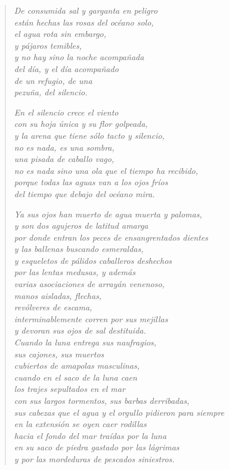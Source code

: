 \documentclass[12pt]{article}
\begin{document}
\clearpage
{}
\begin{verse}

\emph{De consumida sal y garganta en peligro\\
están hechas las rosas del océano solo,\\
el agua rota sin embargo,\\
y pájaros temibles,\\
y no hay sino la noche acompañada\\
del día, y el día acompañado\\
de un refugio, de una\\
pezuña, del silencio.}  

\emph{En el silencio crece el viento\\
con su hoja única y su flor golpeada,\\
y la arena que tiene sólo tacto y silencio,\\
no es nada, es una sombra,\\
una pisada de caballo vago,\\
no es nada sino una ola que el tiempo ha recibido,\\
porque todas las aguas van a los ojos fríos\\
del tiempo que debajo del océano mira.}  

\emph{Ya sus ojos han muerto de agua muerta y palomas,\\
y son dos agujeros de latitud amarga\\
por donde entran los peces de ensangrentados dientes\\
y las ballenas buscando esmeraldas,\\
y esqueletos de pálidos caballeros deshechos\\
por las lentas medusas, y además\\
varias asociaciones de arrayán venenoso,\\
manos aisladas, flechas,\\
revólveres de escama,\\
interminablemente corren por sus mejillas\\
y devoran sus ojos de sal destituida.\\
Cuando la luna entrega sus naufragios,\\
sus cajones, sus muertos\\
cubiertos de amapolas masculinas,\\
cuando en el saco de la luna caen\\
los trajes sepultados en el mar\\
con sus largos tormentos, sus barbas derribadas,\\
sus cabezas que el agua y el orgullo pidieron para siempre\\
en la extensión se oyen caer rodillas\\
hacia el fondo del mar traídas por la luna\\
en su saco de piedra gastado por las lágrimas\\
y por las mordeduras de pescados siniestros.}  


\end{verse}
\end{document}

